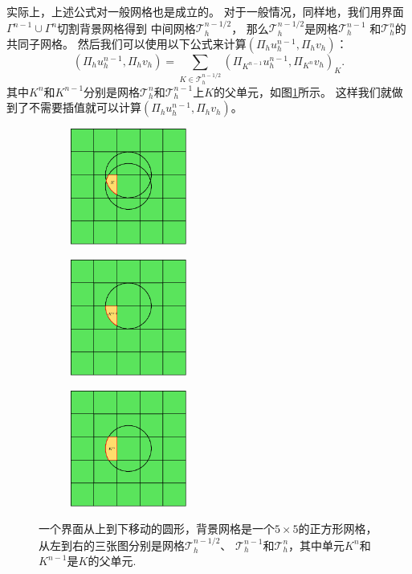实际上，上述公式对一般网格也是成立的。
对于一般情况，同样地，我们用界面$\Gamma^{n-1}\cup\Gamma^n$切割背景网格得到
中间网格$\mathcal{T}_h^{n-1/2}$，
那么$\mathcal{T}_h^{n-1/2}$是网格$\mathcal{T}_h^{n-1}$
和$\mathcal{T}_h^n$的共同子网格。
然后我们可以使用以下公式来计算$(\Pi_h u_h^{n-1}, \Pi_h v_h)$：
\begin{equation}
\label{inner_product_of_two_layer_basis}
(\Pi_h u_h^{n-1}, \Pi_h v_h) = \sum_{K\in \mathcal{T}_h^{n-1/2}}
(\Pi_{K^{n-1}}u_h^{n-1}, \Pi_{K^n}v_h)_{K}.
\end{equation}
其中$K^{n}$和$K^{n-1}$分别是网格$\mathcal{T}_h^n$和$\mathcal{T}_h^{n-1}$上$K$的父单元，如图\ref{fig:parentelement}所示。
这样我们就做到了不需要插值就可以计算$(\Pi_h u_h^{n-1}, \Pi_h v_h)$。

\begin{figure}[h]
\centering
\begin{subfigure}{.3\textwidth}
    \centering
    \includegraphics[width=1.5in]{./figures/movingmaxwell/meshncut.pdf}
\end{subfigure}
\begin{subfigure}{.3\textwidth}
    \centering
    \includegraphics[width=1.5in]{./figures/movingmaxwell/meshn_1.pdf}
\end{subfigure}
\begin{subfigure}{.3\textwidth}
    \centering
     \includegraphics[width=1.5in]{./figures/movingmaxwell/meshn.pdf}
\end{subfigure}
\caption{一个界面从上到下移动的圆形，背景网格是一个$5\times5$的正方形网格，
    从左到右的三张图分别是网格$\mathcal{T}_h^{n-1/2}$、
    $\mathcal{T}_h^{n-1}$和$\mathcal{T}_h^{n}$，其中单元$K^n$和$K^{n-1}$是$K$的父单元.}
  \label{fig:parentelement} %
\end{figure}

